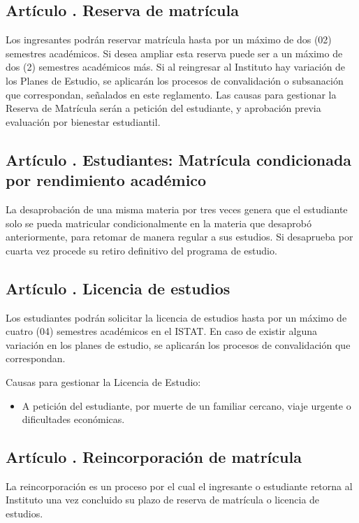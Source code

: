 \subsection{Artículo . Reserva de matrícula}
\addtocounter{ns}{1}
Los ingresantes podrán reservar matrícula hasta por un máximo de dos (02) semestres académicos. Si desea ampliar esta reserva puede ser a un máximo de dos (2) semestres académicos más. Si al reingresar al Instituto hay variación de los Planes de Estudio, se aplicarán los procesos de convalidación o subsanación que correspondan, señalados en este reglamento. Las causas para gestionar la Reserva de Matrícula serán a petición del estudiante, y aprobación previa evaluación por bienestar estudiantil.
\subsection{Artículo . Estudiantes: Matrícula condicionada por rendimiento académico}
\addtocounter{ns}{1}
La desaprobación de una misma materia por tres veces genera que el estudiante solo se pueda matricular condicionalmente en la materia que desaprobó anteriormente, para retomar de manera regular a sus estudios. Si desaprueba por cuarta vez procede su retiro definitivo del programa de estudio. 
\subsection{Artículo . Licencia de estudios}
\addtocounter{ns}{1}
Los estudiantes podrán solicitar la licencia de estudios hasta por un máximo de cuatro (04) semestres académicos en el ISTAT. En caso de existir alguna variación en los planes de estudio, se aplicarán los procesos de convalidación que correspondan.

Causas para gestionar la Licencia de Estudio:

\begin{itemize}
\item A petición del estudiante, por muerte de un familiar cercano, viaje urgente o dificultades económicas.
\end{itemize}
\subsection{Artículo . Reincorporación de matrícula}
\addtocounter{ns}{1}
La reincorporación es un proceso por el cual el ingresante o estudiante retorna al Instituto una vez concluido su plazo de reserva de matrícula o licencia de estudios.


